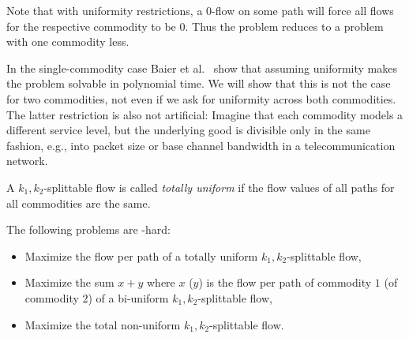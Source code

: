 Note that with uniformity restrictions, a $0$-flow on some path will
force all flows for the respective commodity to be $0$. Thus the
problem reduces to a problem with one commodity less.

In the single-commodity case Baier et
al.~\cite{baier-koehler-skutella:05} show that assuming uniformity
makes the problem solvable in polynomial time. We will show that this
is not the case for two commodities, not even if we ask for uniformity across
both commodities. The latter restriction is also not artificial: Imagine
that each commodity models a different service level, but the
underlying good is divisible only in the same fashion, e.g., into
packet size or base channel bandwidth in a telecommunication network.

\begin{definition}
  A $k_1,k_2$-splittable flow is called \emph{totally uniform} if the flow
  values of all paths for all commodities are the same.
\end{definition}

\begin{lemma}
  The following problems are \NP-hard:
  \begin{itemize}
  \item Maximize the flow per path of a totally uniform 
    $k_1,k_2$-splittable flow,
  \item Maximize the sum $x+y$ where $x$ ($y$) is the flow per path of
    commodity $1$ (of commodity $2$) of a bi-uniform
    $k_1,k_2$-splittable flow,
  \item  Maximize the total non-uniform $k_1,k_2$-splittable
    flow.
  \end{itemize}
\end{lemma}

